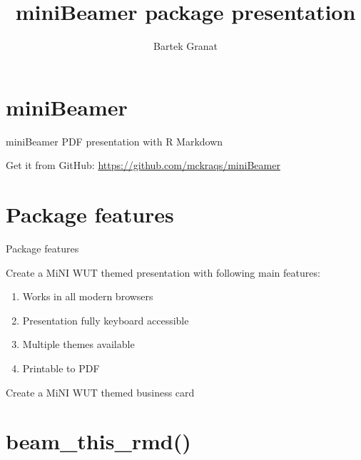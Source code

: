 \documentclass[ignorenonframetext,]{beamer}
\title{miniBeamer package presentation}
\author{Bartek Granat}
\date{}
\providecommand{\tightlist}{%
  \setlength{\itemsep}{0pt}\setlength{\parskip}{0pt}}
\begin{document}
\frame{\titlepage}


\section[]{}

\hypertarget{minibeamer}{%
\section{miniBeamer}\label{minibeamer}}

\begin{frame}{miniBeamer PDF presentation with R Markdown}
\protect\hypertarget{minibeamer-pdf-presentation-with-r-markdown}{}

Get it from GitHub: \url{https://github.com/mckraqs/miniBeamer}

\end{frame}

\hypertarget{package-features}{%
\section{Package features}\label{package-features}}

\begin{frame}{Package features}
\protect\hypertarget{package-features-1}{}

Create a MiNI WUT themed presentation with following main features:

\begin{enumerate}
\tightlist
\item
  Works in all modern browsers
\item
  Presentation fully keyboard accessible
\item
  Multiple themes available
\item
  Printable to PDF
\end{enumerate}

Create a MiNI WUT themed business card

\end{frame}

\hypertarget{beam_this_rmd}{%
\section{beam\_this\_rmd()}\label{beam_this_rmd}}
\end{document}
